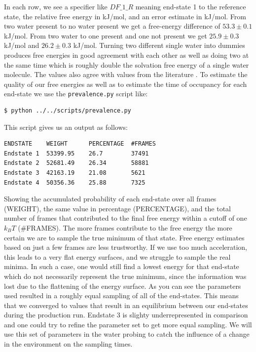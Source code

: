 In each row, we see a specifier like $DF\_1\_R$ meaning end-state 1 to the reference state, the relative free energy in kJ/mol, and an error estimate in kJ/mol. From two water present to no water present we get a free-energy difference of $53.3 \pm 0.1$ kJ/mol. From two water to one present and one not present we get $25.9 \pm 0.3$ kJ/mol and $26.2 \pm 0.3$ kJ/mol. Turning two different single water into dummies produces free energies in good agreement with each other as well as doing two at the same time which is roughly double the solvation free energy of a single water molecule. The values also agree with values from the literature \cite{gracia1}. To estimate the quality of our free energies as well as to estimate the time of occupancy for each end-state we use the \texttt{prevalence.py} script like:

\begin{lstlisting}
$ python ../../scripts/prevalence.py
\end{lstlisting}

This script gives us an output as follows: 

\begin{lstlisting}
ENDSTATE    WEIGHT      PERCENTAGE  #FRAMES
Endstate 1  53399.95    26.7        37491
Endstate 2  52681.49    26.34       58881
Endstate 3  42163.19    21.08       5621
Endstate 4  50356.36    25.88       7325
\end{lstlisting}

Showing the accumulated probability of each end-state over all frames (WEIGHT), the same value in percentage (PERCENTAGE), and the total number of frames that contributed to the final free energy within a cutoff of one $k_BT$ (\#FRAMES). The more frames contribute to the free energy the more certain we are to sample the true minimum of that state. Free energy estimates based on just a few frames are less trustworthy. If we use too much acceleration, this leads to a very flat energy surfaces, and we struggle to sample the real minima. In such a case, one would still find a lowest energy for that end-state which do not necessarily represent the true minimum, since the information was lost due to the flattening of the energy surface. 
As you can see the parameters used resulted in a roughly equal sampling of all of the end-states. This means that we converged to values that result in an equilibrium between our end-states during the production run. Endstate 3 is slighty underrepresented in comparison and one could try to refine the parameter set to get more equal sampling. We will use this set of parameters in the water probing to catch the influence of a change in the environment on the sampling times.

